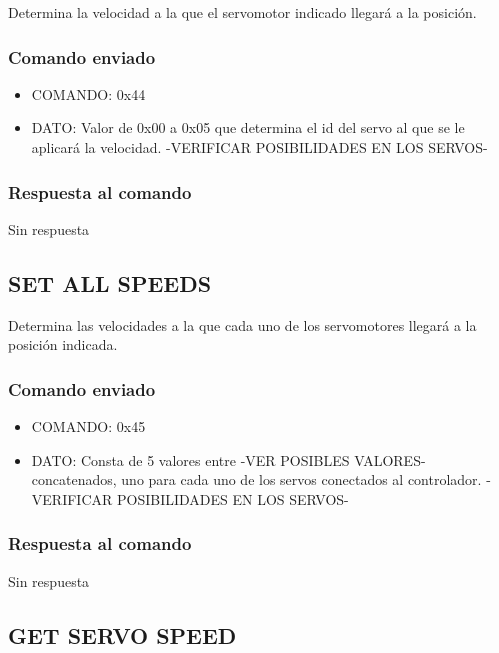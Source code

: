 \documentclass[a4paper,10pt]{article}
\begin{document}
Determina la velocidad a la que el servomotor indicado llegar\'a a la posici\'on.

\subsubsection*{Comando enviado}

\begin{itemize}
	\item{COMANDO:} 0x44
	\item{DATO:} Valor de 0x00 a 0x05 que determina el id del servo al que se le aplicar\'a la velocidad.
	-VERIFICAR POSIBILIDADES EN LOS SERVOS-
\end{itemize}

\subsubsection*{Respuesta al comando}

Sin respuesta

\subsection{SET ALL SPEEDS}
\label{set_all_speeds}

Determina las velocidades a la que cada uno de los servomotores llegar\'a a la posici\'on indicada.

\subsubsection*{Comando enviado}

\begin{itemize}
	\item{COMANDO:} 0x45
	\item{DATO:} Consta de 5 valores entre -VER POSIBLES VALORES- concatenados, uno para cada uno de los servos conectados al controlador.
	-VERIFICAR POSIBILIDADES EN LOS SERVOS-
\end{itemize}

\subsubsection*{Respuesta al comando}

Sin respuesta

\subsection{GET SERVO SPEED}
\label{get_servo_speed}
\end{document}
